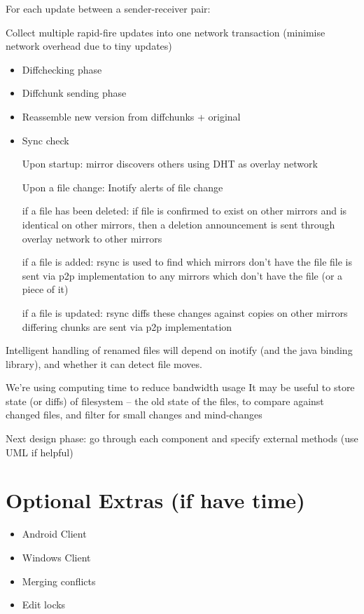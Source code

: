 \documentclass[12pt,a4paper,]{book}
\begin{document}
For each update between a sender-receiver pair:

Collect multiple rapid-fire updates into one network transaction
(minimise network overhead due to tiny updates)

\begin{itemize}
\item
  Diffchecking phase
\item
  Diffchunk sending phase
\item
  Reassemble new version from diffchunks + original
\item
  Sync check

  Upon startup: mirror discovers others using DHT as overlay network

  Upon a file change: Inotify alerts of file change

  if a file has been deleted: if file is confirmed to exist on other
  mirrors and is identical on other mirrors, then a deletion
  announcement is sent through overlay network to other mirrors

  if a file is added: rsync is used to find which mirrors don't have the
  file file is sent via p2p implementation to any mirrors which don't
  have the file (or a piece of it)

  if a file is updated: rsync diffs these changes against copies on
  other mirrors differing chunks are sent via p2p implementation
\end{itemize}

Intelligent handling of renamed files will depend on inotify (and the
java binding library), and whether it can detect file moves.

We're using computing time to reduce bandwidth usage It may be useful to
store state (or diffs) of filesystem -- the old state of the files, to
compare against changed files, and filter for small changes and
mind-changes

Next design phase: go through each component and specify external
methods (use UML if helpful)

\section{Optional Extras (if have
time)}\label{optional-extras-if-have-time}

\begin{itemize}
\itemsep1pt\parskip0pt
\item
  Android Client
\item
  Windows Client
\item
  Merging conflicts
\item
  Edit locks
\end{itemize}
\end{document}

